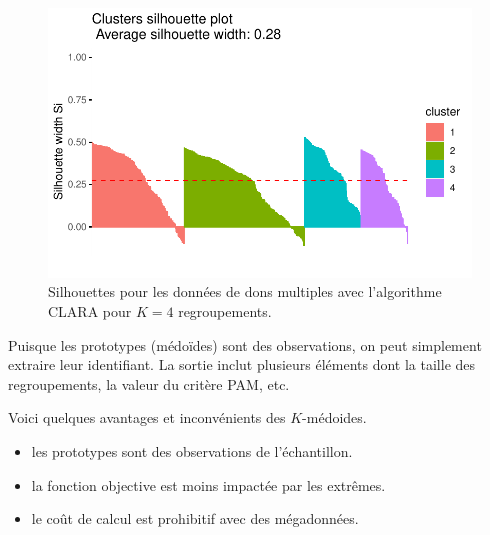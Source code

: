 \documentclass[
  11pt,
  letterpaper,
]{scrbook}
\newenvironment{Shaded}{\begin{snugshade}}{\end{snugshade}}
\newcommand{\CommentTok}[1]{\textcolor[rgb]{0.37,0.37,0.37}{#1}}
\newcommand{\DecValTok}[1]{\textcolor[rgb]{0.68,0.00,0.00}{#1}}
\newcommand{\NormalTok}[1]{\textcolor[rgb]{0.00,0.23,0.31}{#1}}
\newcommand{\OtherTok}[1]{\textcolor[rgb]{0.00,0.23,0.31}{#1}}
\newcommand{\SpecialCharTok}[1]{\textcolor[rgb]{0.37,0.37,0.37}{#1}}
\providecommand{\tightlist}{%
  \setlength{\itemsep}{0pt}\setlength{\parskip}{0pt}}\usepackage{longtable,booktabs,array}
\theoremstyle{definition}
\theoremstyle{remark}
\begin{document}
\begin{figure}[ht!]

{\centering \includegraphics{./03-regroupements_files/figure-pdf/fig-clarasilhouette-1.pdf}

}

\caption{\label{fig-clarasilhouette}Silhouettes pour les données de dons
multiples avec l'algorithme CLARA pour \(K=4\) regroupements.}

\end{figure}

Puisque les prototypes (médoïdes) sont des observations, on peut
simplement extraire leur identifiant. La sortie inclut plusieurs
éléments dont la taille des regroupements, la valeur du critère PAM,
etc.

\begin{Shaded}
\end{Shaded}

Voici quelques avantages et inconvénients des \(K\)-médoides.

\begin{itemize}
\tightlist
\item
  les prototypes sont des observations de l'échantillon.
\item
  la fonction objective est moins impactée par les extrêmes.
\item
  le coût de calcul est prohibitif avec des mégadonnées.
\end{itemize}
\end{document}
